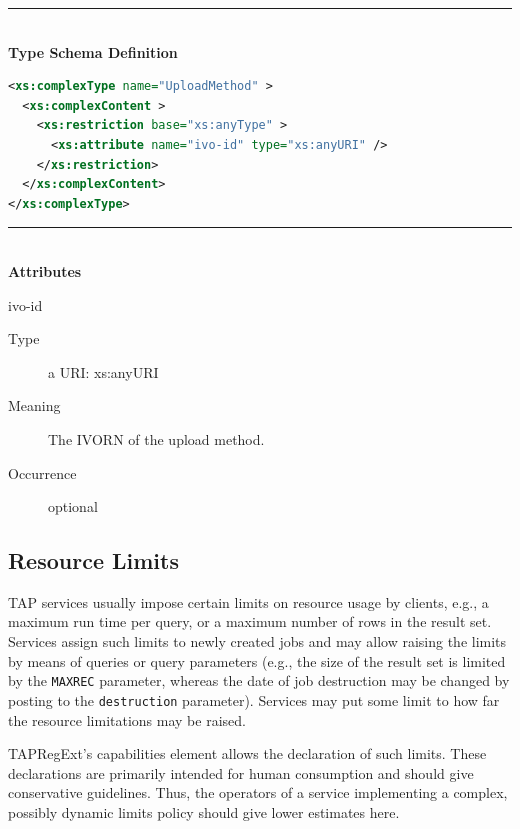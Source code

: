 \documentclass{ivoa}
\begin{document}
\noindent\rule[-2pt]{\textwidth}{0.5pt}\\
			\textbf{ Type Schema Definition}

\begin{lstlisting}[language=XML]
<xs:complexType name="UploadMethod" >
  <xs:complexContent >
    <xs:restriction base="xs:anyType" >
      <xs:attribute name="ivo-id" type="xs:anyURI" />
    </xs:restriction>
  </xs:complexContent>
</xs:complexType>
\end{lstlisting}

\noindent\rule[-2pt]{\textwidth}{0.5pt}\\
					\textbf{ Attributes}

\begin{bigdescription}
\item[ivo-id]
\begin{description}
\item[Type\quad] a URI: xs:anyURI
\item[Meaning\quad] 
            The IVORN of the upload method.
            
\item[Occurrence\quad] optional
\end{description}


\end{bigdescription}



\subsection{Resource Limits}

\label{reslimits}

TAP services usually impose certain limits on resource usage by clients,
e.g., a maximum run time per query, or a maximum number of rows in the result
set.  Services assign such limits to newly created jobs and may
allow raising the limits by means of queries or query parameters (e.g., the
size of the result set is limited by the \texttt{MAXREC} parameter, whereas
the date of job destruction may be changed by posting to the
\texttt{destruction} parameter).  Services may put some limit to how
far the resource limitations may be raised.

TAPRegExt's capabilities element allows the declaration of such limits.
These declarations are primarily intended for human consumption and should give
conservative guidelines.  Thus, the operators of a service implementing a
complex, possibly dynamic limits policy should give lower estimates here.
\end{document}

